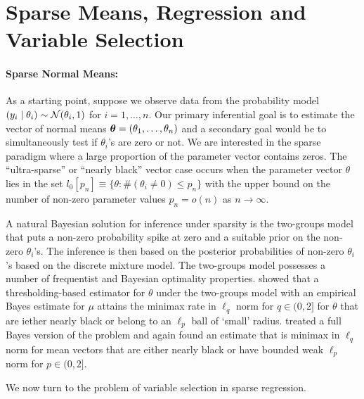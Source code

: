 \documentclass[11pt]{article}
\numberwithin{equation}{section}
\begin{document}
\section{Sparse Means, Regression and Variable Selection}

\paragraph{Sparse Normal Means:} As a starting point, suppose we observe data from the probability model $  (y_i \mid \theta_i)  \sim {\cal N} (\theta_i,1)$ for $i = 1, \ldots, n$. Our primary inferential goal is to estimate the vector of normal means $ \boldsymbol{\theta} = ( \theta_1, \ldots , \theta_n )$ and a secondary goal would be to simultaneously test if $\theta_i$'s are zero or not. We are interested in the sparse paradigm where a large proportion of the parameter vector contains zeros.  The ``ultra-sparse'' or ``nearly black'' vector case occurs when the parameter vector $\theta$ lies in the set $ l_0 [ p_n] \equiv \{ \theta : \# ( \theta_i \neq 0 ) \leq p_n \} $ with the upper bound on the number of non-zero parameter values $ p_n = o(n) $ as $ n \to \infty$. 

A natural Bayesian solution for inference under sparsity is the two-groups model that puts a non-zero probability spike at zero and a suitable prior on the non-zero $\theta_i$'s. The inference is then based on the posterior probabilities of non-zero $\theta_i$'s based on the discrete mixture model. The two-groups model possesses a number of frequentist and Bayesian optimality properties. \cite{johnstone2004needles} showed that a thresholding-based estimator for $\theta$ under the two-groups model with an empirical Bayes estimate for $\mu$ attains the minimax rate in $\ell_q$ norm for $q \in (0,2]$ for $\theta$ that are iether nearly black or belong to an $\ell_p$ ball of `small' radius. \cite{castillo2012needles} treated a full Bayes version of the problem and again found an estimate that is minimax in $\ell_q$ norm for mean vectors that are either nearly black or have bounded weak $\ell_p$ norm for $p \in (0,2]$. 

We now turn to the problem of variable selection in sparse regression. 
\end{document}
